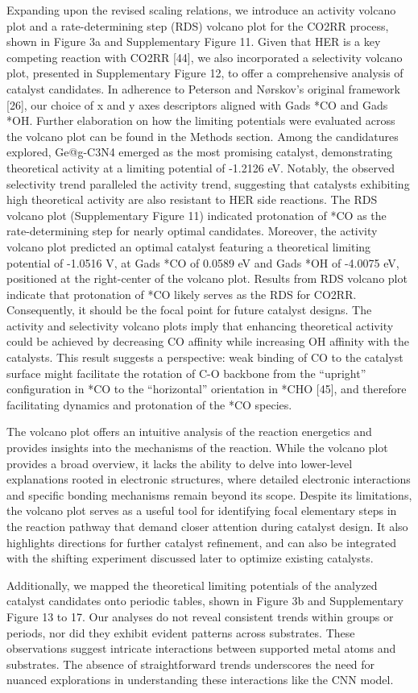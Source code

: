Expanding upon the revised scaling relations, we introduce an activity volcano plot and a rate-determining step (RDS) volcano plot for the CO2RR process, shown in Figure 3a and Supplementary Figure 11. Given that HER is a key competing reaction with CO2RR [44], we also incorporated a selectivity volcano plot, presented in Supplementary Figure 12, to offer a comprehensive analysis of catalyst candidates. In adherence to Peterson and Nørskov's original framework [26], our choice of x and y axes descriptors aligned with Gads *CO and Gads *OH. Further elaboration on how the limiting potentials were evaluated across the volcano plot can be found in the Methods section. Among the candidatures explored, Ge@g-C3N4 emerged as the most promising catalyst, demonstrating theoretical activity at a limiting potential of -1.2126 eV. Notably, the observed selectivity trend paralleled the activity trend, suggesting that catalysts exhibiting high theoretical activity are also resistant to HER side reactions. The RDS volcano plot (Supplementary Figure 11) indicated protonation of *CO as the rate-determining step for nearly optimal candidates. Moreover, the activity volcano plot predicted an optimal catalyst featuring a theoretical limiting potential of -1.0516 V, at Gads *CO of 0.0589 eV and Gads *OH of -4.0075 eV, positioned at the right-center of the volcano plot. Results from RDS volcano plot indicate that protonation of *CO likely serves as the RDS for CO2RR. Consequently, it should be the focal point for future catalyst designs. The activity and selectivity volcano plots imply that enhancing theoretical activity could be achieved by decreasing CO affinity while increasing OH affinity with the catalysts. This result suggests a perspective: weak binding of CO to the catalyst surface might facilitate the rotation of C-O backbone from the “upright” configuration in *CO to the “horizontal” orientation in *CHO [45], and therefore facilitating dynamics and protonation of the *CO species.

The volcano plot offers an intuitive analysis of the reaction energetics and provides insights into the mechanisms of the reaction. While the volcano plot provides a broad overview, it lacks the ability to delve into lower-level explanations rooted in electronic structures, where detailed electronic interactions and specific bonding mechanisms remain beyond its scope. Despite its limitations, the volcano plot serves as a useful tool for identifying focal elementary steps in the reaction pathway that demand closer attention during catalyst design. It also highlights directions for further catalyst refinement, and can also be integrated with the shifting experiment discussed later to optimize existing catalysts.

Additionally, we mapped the theoretical limiting potentials of the analyzed catalyst candidates onto periodic tables, shown in Figure 3b and Supplementary Figure 13 to 17. Our analyses do not reveal consistent trends within groups or periods, nor did they exhibit evident patterns across substrates. These observations suggest intricate interactions between supported metal atoms and substrates. The absence of straightforward trends underscores the need for nuanced explorations in understanding these interactions like the CNN model.
